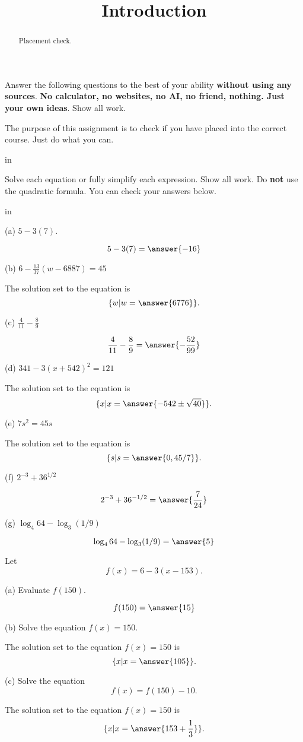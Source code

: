 \documentclass{ximera}
\title{Introduction}
\newcommand{\pskip}{\vskip 0.1 in}
\begin{document}
\begin{abstract}
Placement check. 
\end{abstract}
\maketitle


Answer the following questions to the best of your ability {\bf without using any sources}. {\bf No calculator, no websites, no AI, no friend, nothing. Just your own ideas}. Show all work. %

The purpose of this assignment is to check if you have placed into the correct course. Just do what you can.

\pskip

\begin{question}  \label{Q9df934gmmn}
Solve each equation or fully simplify each expression. Show all work. Do {\bf not} use the quadratic formula. You can check your answers below.

\pskip

(a) $ 5 - 3(7)$.  

\[
       5 - 3(7) =  \answer{-16}
\]

(b) $6 - \frac{13}{37} \left(  w - 6887 \right) = 45$

The solution set to the equation is
\[
    \{w | w= \answer{6776} \} .
\]

(c) $\frac{4}{11} - \frac{8}{9}$

\[
    \frac{4}{11} - \frac{8}{9} = \answer{-\frac{52}{99}} 
\]

(d) $341 - 3 (x+542)^2 =121$

The solution set to the equation is
\[
       \{x | x= \answer{-542 \pm \sqrt{40}} \}.
\]

(e) $7s^2 = 45s $

The solution set to the equation is
\[
       \{s | s= \answer{0, 45/7} \}.
\]

(f) $2^{-3} + 36^{1/2}$

\[
     2^{-3} + 36^{-1/2} = \answer{\frac{7}{24}}
\]

(g) $\log_4 64 - \log_3 (1/9)$

\[
   \log_4 64 - \log_3 (1/9) = \answer{5}
\]


\end{question}

\begin{question}  \label{Q:9sdf85r3}
Let 
\[
   f(x) = 6 - 3(x-153) .
\]

(a) Evaluate $f(150)$.

\[
   f(150)=\answer{15}
\]

(b) Solve the equation $f(x)=150$.

The solution set to the equation $f(x)=150$ is
\[
  \{  x | x = \answer{105}  \}.
\]


(c) Solve the equation
\[
      f(x) = f(150)-10 .
\]

The solution set to the equation $f(x)=150$ is
\[
  \{  x | x = \answer{153 + \frac{1}{3}}  \}.
\]

\end{question}  
\end{document}
